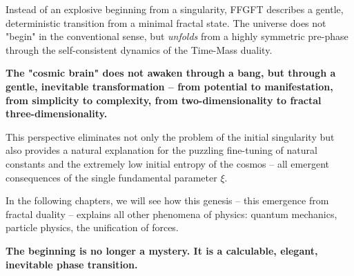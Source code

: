 	Instead of an explosive beginning from a singularity, FFGFT describes a gentle, deterministic transition from a minimal fractal state. The universe does not "begin" in the conventional sense, but \textit{unfolds} from a highly symmetric pre-phase through the self-consistent dynamics of the Time-Mass duality.
	
	\textbf{The "cosmic brain" does not awaken through a bang, but through a gentle, inevitable transformation -- from potential to manifestation, from simplicity to complexity, from two-dimensionality to fractal three-dimensionality.}
	
	This perspective eliminates not only the problem of the initial singularity but also provides a natural explanation for the puzzling fine-tuning of natural constants and the extremely low initial entropy of the cosmos -- all emergent consequences of the single fundamental parameter $\xi$.
	
	In the following chapters, we will see how this genesis -- this emergence from fractal duality -- explains all other phenomena of physics: quantum mechanics, particle physics, the unification of forces.
	
	\textbf{The beginning is no longer a mystery. It is a calculable, elegant, inevitable phase transition.}



